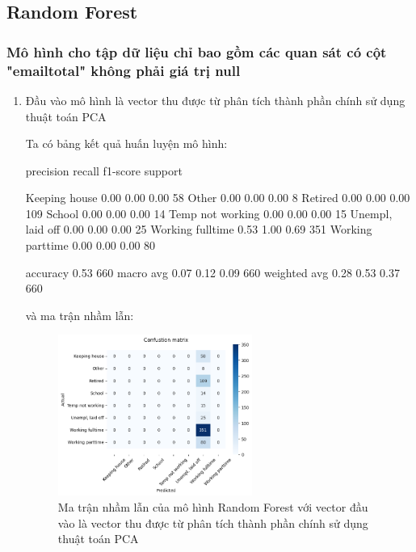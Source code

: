 \subsection{Random Forest}

\subsubsection{Mô hình cho tập dữ liệu chỉ bao gồm các quan sát có cột "emailtotal" không phải giá trị null}

\begin{enumerate}[label=(\alph*)]
    \item Đầu vào mô hình là vector thu được từ phân tích thành phần chính sử dụng thuật toán PCA
    
    Ta có bảng kết quả huấn luyện mô hình:

    \begin{python}
                    precision    recall  f1-score   support

   Keeping house       0.00      0.00      0.00        58
           Other       0.00      0.00      0.00         8
         Retired       0.00      0.00      0.00       109
          School       0.00      0.00      0.00        14
Temp not working       0.00      0.00      0.00        15
Unempl, laid off       0.00      0.00      0.00        25
Working fulltime       0.53      1.00      0.69       351
Working parttime       0.00      0.00      0.00        80

        accuracy                           0.53       660
       macro avg       0.07      0.12      0.09       660
    weighted avg       0.28      0.53      0.37       660
    \end{python}

    và ma trận nhầm lẫn:

    \begin{figure}[H]
        \centering
        \includegraphics[width=0.6\textwidth]{figures/Thanh/Models/Random_Forest/Non_null_models_confusion_matrix_Random_Forest_PCA_features.png}
        \caption{Ma trận nhầm lẫn của mô hình Random Forest với vector đầu vào là vector thu được từ phân tích thành phần chính sử dụng thuật toán PCA}
        \label{fig:Non_null_models_confusion_matrix_Random_Forest_PCA_features}
    \end{figure}


\end{enumerate}
